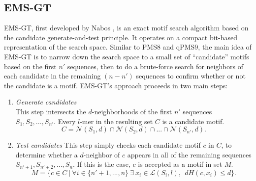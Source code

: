 \documentclass[oneside,12pt]{DISCSthesis}
\begin{document}
	\subsection{EMS-GT}
		EMS-GT, first developed by Nabos \cite{nabos2015dissertation}, is an exact motif search algorithm based on the candidate generate-and-test principle. It operates on a compact bit-based representation of the search space. Similar to PMS8 and qPMS9, the main idea of EMS-GT is to narrow down the search space to a small set of ``candidate'' motifs based on the first $n'$ sequences, then to do a brute-force search for neighbors of each candidate in the remaining $(n - n')$ sequences to confirm whether or not the candidate is a motif.
		EMS-GT's approach proceeds in two main steps:
		\begin{enumerate}
			\item {\em Generate candidates}\\
				This step intersects the $d$-neighborhoods of the first $n'$ sequences $S_{1},S_{2},...,S_{n'}$. Every $l$-mer in the resulting set $C$ is a candidate motif.
				\begin{equation}
					C = \mathcal{N}(S_{1}, d) \cap \mathcal{N}(S_{2}, d) \cap...\cap \mathcal{N}(S_{n'}, d).
					\end{equation}
			\item {\em Test candidates}\newline
				This step simply checks each candidate motif $c$ in $C$, to determine whether a $d$-neighbor of $c$ appears in all of the remaining sequences $S_{n'+1},S_{n'+2},...,S_{n}$. If this is the case, $c$ is accepted as a motif in set $M$.
				\begin{equation}
					M =\{ c \in C\ |\ \forall i \in \{n'+1,...,n\}\ \exists\ x_i \in \mathcal{L}(S_i, l),\ \ 
					dH(c, x_i) \leq d \}.
					\end{equation}
			\end{enumerate}\newpage
\end{document}
